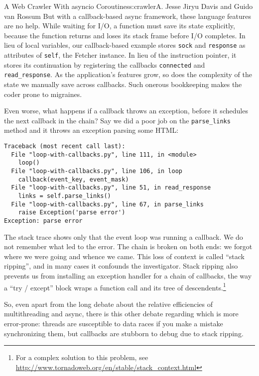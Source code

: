 \begin{aosachapter}{A Web Crawler With asyncio Coroutines}{s:crawler}{A. Jesse Jiryu Davis and Guido van Rossum}
But with a callback-based async framework, these language features are
no help. While waiting for I/O, a function must save its state
explicitly, because the function returns and loses its stack frame
before I/O completes. In lieu of local variables, our callback-based
example stores \texttt{sock} and \texttt{response} as attributes of
\texttt{self}, the Fetcher instance. In lieu of the instruction pointer,
it stores its continuation by registering the callbacks
\texttt{connected} and \texttt{read\_response}. As the application's
features grow, so does the complexity of the state we manually save
across callbacks. Such onerous bookkeeping makes the coder prone to
migraines.

Even worse, what happens if a callback throws an exception, before it
schedules the next callback in the chain? Say we did a poor job on the
\texttt{parse\_links} method and it throws an exception parsing some
HTML:

\begin{verbatim}
Traceback (most recent call last):
  File "loop-with-callbacks.py", line 111, in <module>
    loop()
  File "loop-with-callbacks.py", line 106, in loop
    callback(event_key, event_mask)
  File "loop-with-callbacks.py", line 51, in read_response
    links = self.parse_links()
  File "loop-with-callbacks.py", line 67, in parse_links
    raise Exception('parse error')
Exception: parse error
\end{verbatim}

The stack trace shows only that the event loop was running a callback.
We do not remember what led to the error. The chain is broken on both
ends: we forgot where we were going and whence we came. This loss of
context is called ``stack ripping'', and in many cases it confounds the
investigator. Stack ripping also prevents us from installing an
exception handler for a chain of callbacks, the way a ``try / except''
block wraps a function call and its tree of descendents.\footnote{For a
  complex solution to this problem, see
  \url{http://www.tornadoweb.org/en/stable/stack_context.html}}

So, even apart from the long debate about the relative efficiencies of
multithreading and async, there is this other debate regarding which is
more error-prone: threads are susceptible to data races if you make a
mistake synchronizing them, but callbacks are stubborn to debug due to
stack ripping.

\label{coroutines}


\end{aosachapter}
